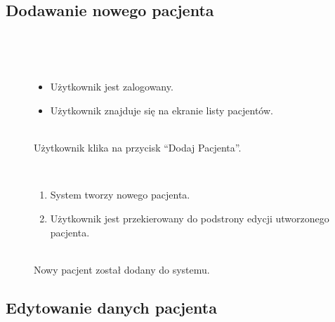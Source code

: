 \documentclass[11pt]{aghdpl}
\begin{document}
\subsection{Dodawanie nowego pacjenta}

	\begin{description}
		\item[\useCaseAktor] \hfill \\
			\useCaseUzytkownik
		\item[\useCaseWarPocz] \hfill \\
			\begin{itemize}
				\item Użytkownik jest zalogowany.
				\item Użytkownik znajduje się na ekranie listy pacjentów.
			\end{itemize}
		\item[\useCaseZdarzInicj] \hfill \\
			Użytkownik klika na przycisk ``Dodaj Pacjenta''.
		\item[\useCaseScenBaz] \hfill \\ 
			\begin{enumerate}
				\item System tworzy nowego pacjenta.
				\item Użytkownik jest przekierowany do podstrony edycji utworzonego pacjenta.
			\end{enumerate}
		\item[\useCaseWarKonc] \hfill \\ 
			Nowy pacjent został dodany do systemu.
	\end{description}

\subsection{Edytowanie danych pacjenta}
\end{document}
